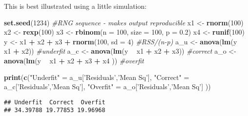 \documentclass[]{book}
\newenvironment{Shaded}{\begin{snugshade}}{\end{snugshade}}
\newcommand{\CommentTok}[1]{\textcolor[rgb]{0.56,0.35,0.01}{\textit{#1}}}
\newcommand{\DataTypeTok}[1]{\textcolor[rgb]{0.13,0.29,0.53}{#1}}
\newcommand{\DecValTok}[1]{\textcolor[rgb]{0.00,0.00,0.81}{#1}}
\newcommand{\FloatTok}[1]{\textcolor[rgb]{0.00,0.00,0.81}{#1}}
\newcommand{\KeywordTok}[1]{\textcolor[rgb]{0.13,0.29,0.53}{\textbf{#1}}}
\newcommand{\NormalTok}[1]{#1}
\newcommand{\OperatorTok}[1]{\textcolor[rgb]{0.81,0.36,0.00}{\textbf{#1}}}
\newcommand{\StringTok}[1]{\textcolor[rgb]{0.31,0.60,0.02}{#1}}
\theoremstyle{definition}
\theoremstyle{definition}
\theoremstyle{definition}
\theoremstyle{remark}
\begin{document}
This is best illustrated using a little simulation:

\begin{Shaded}
\begin{Highlighting}[]
\KeywordTok{set.seed}\NormalTok{(}\DecValTok{1234}\NormalTok{) }\CommentTok{#RNG sequence - makes output reproducible}
\NormalTok{x1 <-}\StringTok{ }\KeywordTok{rnorm}\NormalTok{(}\DecValTok{100}\NormalTok{)}
\NormalTok{x2 <-}\StringTok{ }\KeywordTok{rexp}\NormalTok{(}\DecValTok{100}\NormalTok{)}
\NormalTok{x3 <-}\StringTok{ }\KeywordTok{rbinom}\NormalTok{(}\DataTypeTok{n =} \DecValTok{100}\NormalTok{, }\DataTypeTok{size =} \DecValTok{100}\NormalTok{, }\DataTypeTok{p =} \FloatTok{0.2}\NormalTok{)}
\NormalTok{x4 <-}\StringTok{ }\KeywordTok{runif}\NormalTok{(}\DecValTok{100}\NormalTok{)}
\NormalTok{y <-}\StringTok{ }\NormalTok{x1 }\OperatorTok{+}\StringTok{ }\NormalTok{x2 }\OperatorTok{+}\StringTok{ }\NormalTok{x3 }\OperatorTok{+}\StringTok{ }\KeywordTok{rnorm}\NormalTok{(}\DecValTok{100}\NormalTok{, }\DataTypeTok{sd =} \DecValTok{4}\NormalTok{)}
\CommentTok{#RSS/(n-p)}
\NormalTok{a_u <-}\StringTok{ }\KeywordTok{anova}\NormalTok{(}\KeywordTok{lm}\NormalTok{(y }\OperatorTok{~}\StringTok{ }\NormalTok{x1 }\OperatorTok{+}\StringTok{ }\NormalTok{x2)) }\CommentTok{#underfit}
\NormalTok{a_c  <-}\StringTok{ }\KeywordTok{anova}\NormalTok{(}\KeywordTok{lm}\NormalTok{(y }\OperatorTok{~}\StringTok{ }\NormalTok{x1 }\OperatorTok{+}\StringTok{ }\NormalTok{x2 }\OperatorTok{+}\StringTok{ }\NormalTok{x3)) }\CommentTok{#correct}
\NormalTok{a_o <-}\StringTok{ }\KeywordTok{anova}\NormalTok{(}\KeywordTok{lm}\NormalTok{(y }\OperatorTok{~}\StringTok{ }\NormalTok{x1 }\OperatorTok{+}\StringTok{ }\NormalTok{x2 }\OperatorTok{+}\StringTok{ }\NormalTok{x3 }\OperatorTok{+}\StringTok{ }\NormalTok{x4 )) }\CommentTok{#overfit}

\KeywordTok{print}\NormalTok{(}\KeywordTok{c}\NormalTok{(}\StringTok{"Underfit"}\NormalTok{ =}\StringTok{ }\NormalTok{a_u[}\StringTok{'Residuals'}\NormalTok{,}\StringTok{'Mean Sq'}\NormalTok{], }
         \StringTok{"Correct"}\NormalTok{ =}\StringTok{ }\NormalTok{a_c[}\StringTok{'Residuals'}\NormalTok{,}\StringTok{'Mean Sq'}\NormalTok{], }
        \StringTok{"Overfit"}\NormalTok{ =}\StringTok{ }\NormalTok{a_o[}\StringTok{'Residuals'}\NormalTok{,}\StringTok{'Mean Sq'}\NormalTok{]}
\NormalTok{))}
\end{Highlighting}
\end{Shaded}

\begin{verbatim}
## Underfit  Correct  Overfit 
## 34.39788 19.77853 19.96968
\end{verbatim}
\end{document}
